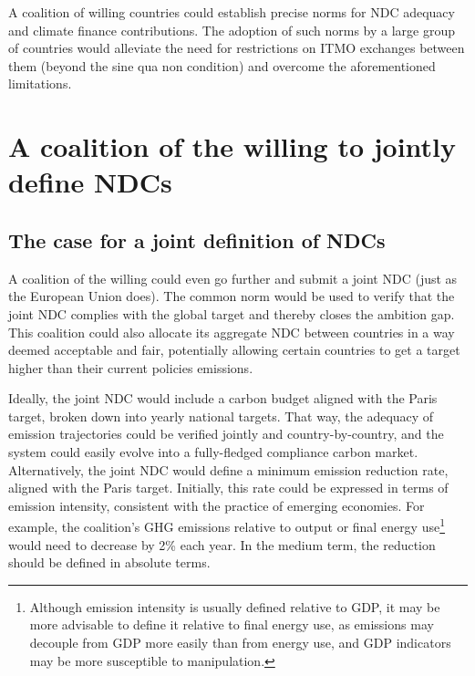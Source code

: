 \documentclass[12pt,english]{article}
\begin{document}
A coalition of willing countries could %
establish precise norms for NDC adequacy and climate finance contributions. The adoption of such norms by a large group of countries would alleviate the need for restrictions on ITMO exchanges between them (beyond the sine qua non condition) and overcome the aforementioned limitations.

\section{A coalition of the willing to jointly define NDCs\label{sec:itmo}}

\subsection{The case for a joint definition of NDCs}\label{subsec:itmo_proposal}

A coalition of the willing could even go further and submit a joint NDC %
(just as the European Union does). 
The common norm would be used to verify that the joint NDC complies with the global target and thereby closes the ambition gap. %
This coalition could also allocate its aggregate NDC between countries in a way deemed acceptable and fair, potentially allowing certain countries to get a target higher than their current policies emissions.

Ideally, the joint NDC would include a carbon budget aligned with the Paris target, broken down into yearly national targets. That way, the adequacy of emission trajectories could be verified jointly and country-by-country, 
and the system could easily evolve into a fully-fledged compliance carbon market. 
Alternatively, the joint NDC would define a minimum emission reduction rate, aligned with the Paris target. Initially, this rate could be expressed in terms of emission intensity, consistent with the practice of emerging economies. For example, the coalition's GHG emissions relative to output or final energy use\footnote{Although emission intensity is usually defined relative to GDP, it may be more advisable to define it relative to final energy use, as emissions may decouple from GDP more easily than from energy use, and GDP indicators may be more susceptible to manipulation.} %
would need to decrease by 2\% each year. In the medium term, the reduction should be defined in absolute terms.
\end{document}
